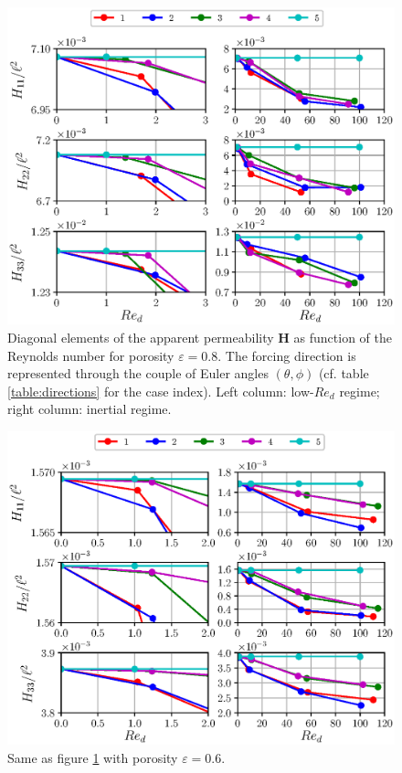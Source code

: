 \begin{figure}[H]
	\centering
	\includegraphics[width=1\textwidth]{chapter_4/figure/H_of08}
	\caption{Diagonal elements of the apparent permeability $\mathbf{H}$ as function of the Reynolds number for porosity  $\varepsilon=0.8$. The forcing  direction is represented through the couple of Euler  angles 
		$(\theta,\phi)$ (cf. table \ref{table:directions} for the case index). Left column: low-$Re_d$ regime; right column: inertial regime.}
	\label{fig:08_H}
\end{figure} 

\begin{figure}[H]
	\centering
	\includegraphics[width=1\textwidth]{chapter_4/figure/H_of06}
	\caption{Same as figure \ref{fig:08_H} with porosity $\varepsilon=0.6$.}
	\label{fig:06_H}
\end{figure}



